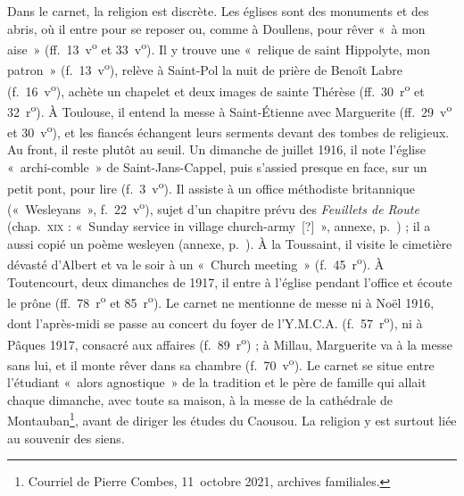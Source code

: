 Dans le carnet, la religion est discrète. Les églises sont des monuments et des abris, où il entre pour se reposer ou, comme à Doullens, pour rêver «~à mon aise~» (ff.~13~v\textsuperscript{o} et 33~v\textsuperscript{o}). Il y trouve une «~relique de saint Hippolyte, mon patron~» (f.~13~v\textsuperscript{o}), relève à Saint-Pol la nuit de prière de Benoît Labre (f.~16~v\textsuperscript{o}), achète un chapelet et deux images de sainte Thérèse (ff.~30~r\textsuperscript{o} et 32~r\textsuperscript{o}). À Toulouse, il entend la messe à Saint-Étienne avec Marguerite (ff.~29~v\textsuperscript{o} et 30~v\textsuperscript{o}), et les fiancés échangent leurs serments devant des tombes de religieux. Au front, il reste plutôt au seuil. Un dimanche de juillet 1916, il note l'église «~archi-comble~» de Saint-Jans-Cappel, puis s'assied presque en face, sur un petit pont, pour lire (f.~3~v\textsuperscript{o}). Il assiste à un office méthodiste britannique («~Wesleyans~», f.~22~v\textsuperscript{o}), sujet d'un chapitre prévu des \textit{Feuillets de Route} (chap.~\textsc{xix} : «~Sunday service in village church-army~[?]~», annexe, p.~\pageref{annexe:doc6-xix}) ; il a aussi copié un poème wesleyen (annexe, p.~\pageref{annexe:doc4}). À la Toussaint, il visite le cimetière dévasté d'Albert et va le soir à un «~Church meeting~» (f.~45~r\textsuperscript{o}). À Toutencourt, deux dimanches de 1917, il entre à l'église pendant l'office et écoute le prône (ff.~78~r\textsuperscript{o} et 85~r\textsuperscript{o}). Le carnet ne mentionne de messe ni à Noël 1916, dont l'après-midi se passe au concert du foyer de l'Y.M.C.A. (f.~57~r\textsuperscript{o}), ni à Pâques 1917, consacré aux affaires (f.~89~r\textsuperscript{o}) ; à Millau, Marguerite va à la messe sans lui, et il monte rêver dans sa chambre (f.~70~v\textsuperscript{o}). Le carnet se situe entre l'étudiant «~alors agnostique~» de la tradition et le père de famille qui allait chaque dimanche, avec toute sa maison, à la messe de la cathédrale de Montauban\footnote{Courriel de Pierre Combes, 11~octobre 2021, archives familiales.}, avant de diriger les études du Caousou. La religion y est surtout liée au souvenir des siens.

